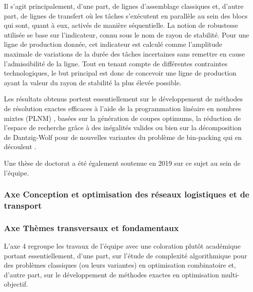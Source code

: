 Il s’agit principalement, d’une part, de lignes d’assemblage classiques et, d’autre part, de lignes de transfert où les tâches s'exécutent en parallèle au sein des blocs qui sont, quant à eux, activés de manière séquentielle. La notion de robustesse utilisée se base sur l'indicateur, connu sous le nom de rayon de stabilité. Pour une ligne de production donnée, cet indicateur est calculé comme l’amplitude maximale de variations de la durée des tâches incertaines sans remettre en cause l’admissibilité de la ligne. 
Tout en tenant compte de différentes contraintes technologiques, le but principal est donc de concevoir une ligne de production ayant la valeur du rayon de stabilité la plus élevée possible.  

Les résultats obtenus portent essentiellement sur le développement de méthodes de résolution exactes efficaces à l’aide de la programmation linéaire en nombres mixtes (PLNM) \cite{rossi:hal-01301625}, basées sur la génération de coupes optimums, la réduction de l’espace de recherche grâce à des inégalités valides \cite{pirogov:hal-01614455,pirogov:hal-01713722,pirogov:hal-01832920} ou bien sur la décomposition de Dantzig-Wolf pour de nouvelles variantes du problème de bin-packing qui en découlent \cite{schepler:hal-01474542,schepler:hal-01518356,schepler:hal-02485676}.  

Une thèse de doctorat \cite{pirogov:tel-02418792} a été également soutenue en 2019 sur ce sujet au sein de l’équipe.
  

  \subsubsection{Axe Conception et optimisation des réseaux logistiques et de transport}
  		
  \subsubsection{Axe Thèmes transversaux et fondamentaux}
  
L'axe 4 regroupe les travaux de l'équipe avec une coloration plutôt académique portant essentiellement, d'une part, sur l'étude de complexité algorithmique pour des problèmes classiques (ou leurs variantes) en optimisation combinatoire et, d'autre part, sur le développement de méthodes exactes en optimisation multi-objectif.      

